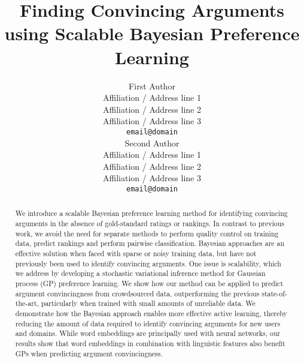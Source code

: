 \documentclass[11pt,letterpaper]{article}
\title{ 
Finding Convincing Arguments using Scalable Bayesian Preference Learning
}
\author{First Author \\
  Affiliation / Address line 1 \\
  Affiliation / Address line 2 \\
  Affiliation / Address line 3 \\
  {\tt email@domain} \\\And
  Second Author \\
  Affiliation / Address line 1 \\
  Affiliation / Address line 2 \\
  Affiliation / Address line 3 \\
  {\tt email@domain} \\}
\date{}
\begin{document}
\maketitle
\begin{abstract}
We introduce a scalable Bayesian preference learning method for identifying
convincing arguments in the absence of gold-standard ratings or rankings.
In contrast to previous work, we avoid the need for separate methods
to perform quality control on training data, predict rankings and perform pairwise classification.
Bayesian approaches are an effective solution when faced with sparse or noisy training data, 
but have not previously been used to identify convincing arguments.
One issue is scalability, which we address by developing a 
stochastic variational inference method for Gaussian process (GP) preference learning.
We show how our method can be applied to predict argument convincingness from crowdsourced data, 
outperforming the previous state-of-the-art, particularly when trained with small amounts of unreliable data.  
We demonstrate how the Bayesian approach enables more effective active learning,
thereby reducing the amount of data required to identify convincing arguments for new users and domains.
While word embeddings are principally used with neural networks, our results show that word embeddings in combination with linguistic features also benefit GPs when predicting argument convincingness.
\end{abstract}

%









\cleardoublepage

%



\end{document}
